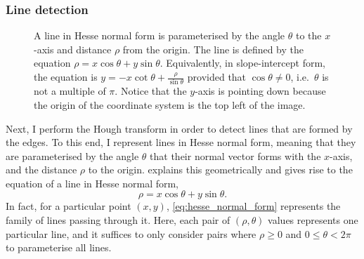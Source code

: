 \documentclass[../report.tex]{subfiles}
\begin{document}
\subsubsection{Line detection}
\begin{figure}
    \centering
    \caption[A line in Hesse normal form.]{A line in Hesse normal form is parameterised by the angle $\theta$ to the $x$-axis and distance $\rho$ from the origin. The line is defined by the equation $\rho = x \cos \theta + y \sin \theta$. Equivalently, in slope-intercept form, the equation is $y = -x \cot \theta + \frac{\rho}{\sin \theta}$ provided that $\cos \theta \neq 0$, i.e.\ $\theta$ is not a multiple of $\pi$. Notice that the $y$-axis is pointing down because the origin of the coordinate system is the top left of the image.}
    \label{fig:hesse_normal_form}
\end{figure}
Next, I perform the Hough transform \cite{hough1962,duda1972} in order to detect lines that are formed by the edges.
To this end, I represent lines in Hesse normal form, meaning that they are parameterised by the angle $\theta$ that their normal vector forms with the $x$-axis, and the distance $\rho$ to the origin.
 explains this geometrically and gives rise to the equation of a line in Hesse normal form,
\begin{equation}
    \label{eq:hesse_normal_form}
    \rho = x \cos \theta + y \sin \theta.
\end{equation}
In fact, for a particular point $(x,y)$, \cref{eq:hesse_normal_form} represents the family of lines passing through it.
Here, each pair of $(\rho, \theta)$ values represents one particular line, and it suffices to only consider pairs where $\rho \geq 0$ and $0 \leq \theta < 2 \pi$ to parameterise all lines.
\end{document}
